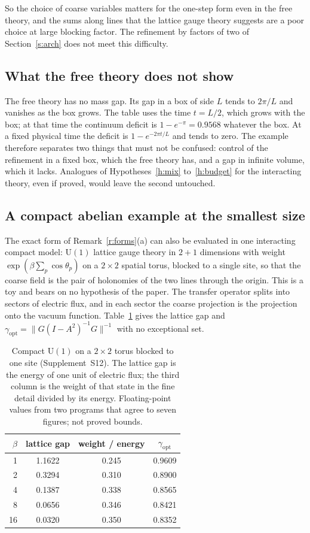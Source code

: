 So the choice of coarse variables matters for the one-step form even in the free theory, and the sums
along lines that the lattice gauge theory suggests are a poor choice at large blocking factor. The
refinement by factors of two of Section~\ref{s:arch} does not meet this difficulty.

\subsection*{What the free theory does not show}
The free theory has no mass gap. Its gap in a box of side $L$ tends
to $2\pi/L$ and vanishes as the box grows. The table uses the time $t=L/2$, which grows with the box; at that
time the continuum deficit is $1-e^{-\pi}=0.9568$ whatever the box. At a fixed physical time the deficit is
$1-e^{-2\pi t/L}$ and tends to zero. The example therefore separates two things that must not be confused:
control of the refinement in a fixed box, which the free theory has, and a gap in infinite volume, which it
lacks. Analogues of Hypotheses~\ref{h:mix} to~\ref{h:budget} for the interacting theory, even if proved, would
leave the second untouched.

\subsection*{A compact abelian example at the smallest size}
The exact form of Remark~\ref{r:forms}(a) can also
be evaluated in one interacting compact model: $\mathrm U(1)$ lattice gauge theory in $2+1$ dimensions with
weight $\exp(\beta\sum_p\cos\theta_p)$ on a $2\times2$ spatial torus, blocked to a single site, so that the
coarse field is the pair of holonomies of the two lines through the origin. This is a toy and bears on no
hypothesis of the paper. The transfer operator splits into sectors of electric flux, and in each sector the
coarse projection is the projection onto the vacuum function. Table~\ref{tab:u1} gives the lattice gap and
$\gamma_{\mathrm{opt}}=\|G(I-A^2)^{-1}G\|^{-1}$ with no exceptional set.

\begin{table}[htbp]
\caption{Compact $\mathrm U(1)$ on a $2\times2$ torus blocked to one site (Supplement~S12). The lattice gap is
the energy of one unit of electric flux; the third column is the weight of that state in the fine detail
divided by its energy. Floating-point values from two programs that agree to seven figures; not proved bounds.}\label{tab:u1}
\centering\small
\begin{tabular}{@{}rccc@{}}
\toprule
$\beta$ & lattice gap & weight / energy & $\gamma_{\mathrm{opt}}$ \\
\midrule
1 & 1.1622 & 0.245 & 0.9609 \\
2 & 0.3294 & 0.310 & 0.8900 \\
4 & 0.1387 & 0.338 & 0.8565 \\
8 & 0.0656 & 0.346 & 0.8421 \\
16 & 0.0320 & 0.350 & 0.8352 \\
\bottomrule
\end{tabular}
\end{table}

